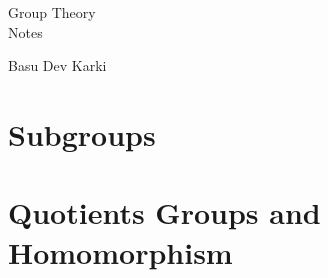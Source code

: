 \documentclass[12pt]{article}
\theoremstyle{definition}
\theoremstyle{plain}
\theoremstyle{definition}
\begin{document}
\begin{titlepage}
    \centering
    \vspace*{4cm} %

    {\Huge Group Theory\\[0.5em]
    \huge Notes\\[1em]}
    
    {\LARGE Basu Dev Karki\par}
\end{titlepage}

{
    \thispagestyle{plain}
    \tableofcontents
}

\eject
\section{Subgroups}

\eject

\eject

\eject


\eject
\section{Quotients Groups and Homomorphism}

\eject

\eject

% 
\end{document}
